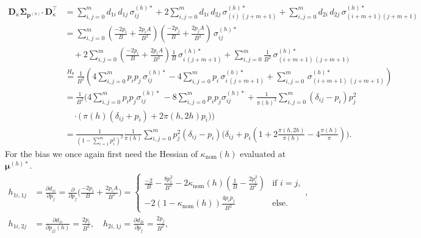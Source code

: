 ﻿\documentclass[12pt,a4paper]{scrreprt}
\theoremstyle{definition}
\begin{document}
\begin{appendices}
\begin{align*}
    \boldsymbol{D}_\kappa \boldsymbol{\Sigma}_{\boldsymbol{p}^{(h)*}} \boldsymbol{D}_\kappa^\top
    &= \sum_{i,j=0}^{m} d_{1i}\,d_{1j}\,\sigma^{(h)*}_{ij}
    + 2\sum_{i,j=0}^{m} d_{1i}\,d_{2j}\,\sigma^{(h)*}_{(i)\,(j+m+1)}
    + \sum_{i,j=0}^{m} d_{2i}\,d_{2j}\,\sigma^{(h)*}_{(i+m+1)(j+m+1)} \\
    &= \sum_{i,j=0}^{m} \left(\frac{-2 p_i}{B} + \frac{2 p_i A}{B^2}\right) \left(\frac{-2 p_j}{B} + \frac{2 p_j A}{B^2}\right)\,\sigma^{(h)*}_{ij} \\
    &\quad + 2\sum_{i,j=0}^{m} \left(\frac{-2 p_i}{B} + \frac{2 p_i A}{B^2}\right)\frac{1}{B}\,\sigma^{(h)*}_{i\,(j+m+1)} 
    + \sum_{i,j=0}^{m} \frac{1}{B^2}\,\sigma^{(h)*}_{(i+m+1)\,(j+m+1)} \\
    &\overset{H_0}{=} \frac{1}{B^2}\left(4\sum_{i,j=0}^{m} p_i p_j \,\sigma^{(h)*}_{ij}
    - 4\sum_{i,j=0}^{m} p_i \,\sigma^{(h)*}_{i\, (j+m+1)} 
    + \sum_{i,j=0}^{m} \,\sigma^{(h)*}_{(i+m+1)\,(j+m+1)}\right) \\
    &= \frac{1}{B^2}\biggl(
        4\sum_{i,j=0}^{m} p_i p_j \sigma^{(h)*}_{ij}\,
        - 8\sum_{i,j=0}^{m} p_i p_j \sigma^{(h)*}_{ij}
        + \frac{1}{\pi(h)^2} \sum_{i,j=0}^{m} (\delta_{ij}-p_i)p_j^2 \\    
        &\quad \cdot \bigl(\,\pi(h)(\delta_{ij} + p_i) +  2\pi(h, 2h)p_i\bigr)
      \biggr) \\
    &= \frac{1}{(1-\sum_{i=1}^{m}p_i^2)^2} \frac{1}{\pi(h)} \sum_{i, j = 0}^{m}p_j^2 
        (\delta_{ij}-p_i)\bigl(\delta_{ij} +  p_i (1+ 2\frac{\pi(h, 2h)}{\pi(h)} - 4\frac{\pi(h)}{\pi})\bigr).
\end{align*} 
\noindent For the bias we once again first need the Hessian of $\kappa_{\mathrm{nom}}(h)$ evaluated at $\boldsymbol{\mu}^{(h)*}$.
\begin{align*}
    h_{1i, 1j} &= \frac{\partial d_{1i}}{\partial p_j} = \frac{\partial}{\partial p_j} \bigl(\frac{-2p_i}{B} + \frac{2p_i A}{B^2}\bigr) 
    =\begin{cases} \frac{-2}{B} - \frac{8 p_i^2}{B^2} -2 \kappa_{ \mathrm{nom}}(h) (\frac{1}{B} - \frac{2p_i^2}{B^2})  & \text{if } i = j,\\
          -2(1-\kappa_{\mathrm{nom}}(h))\frac{4p_i p_j}{B^2} & \text{else.}
    \end{cases}, \\
    h_{1i, 2j} &= \frac{\partial d_{1i}}{\partial p_{jj}(h)} = \frac{2 p_i}{B^2},
    \quad h_{2i, 1j} = \frac{\partial d_{2i}}{\partial p_{j}} =  \frac{2p_j}{B^2},

\end{align*}
\end{appendices}
\end{document}
